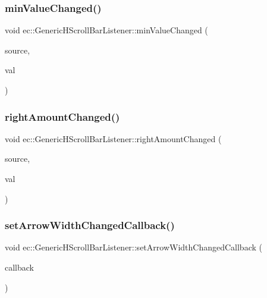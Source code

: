\subsubsection{\texorpdfstring{min\+Value\+Changed()}{minValueChanged()}}
{\footnotesize\ttfamily void ec\+::\+Generic\+H\+Scroll\+Bar\+Listener\+::min\+Value\+Changed (\begin{DoxyParamCaption}\item[{agui\+::\+H\+Scroll\+Bar $\ast$}]{source,  }\item[{int}]{val }\end{DoxyParamCaption})\hspace{0.3cm}{\ttfamily [override]}}

\mbox{\label{classec_1_1_generic_h_scroll_bar_listener_a770fbca4c0ce3c02dec9045e44043737}} 
\subsubsection{\texorpdfstring{right\+Amount\+Changed()}{rightAmountChanged()}}
{\footnotesize\ttfamily void ec\+::\+Generic\+H\+Scroll\+Bar\+Listener\+::right\+Amount\+Changed (\begin{DoxyParamCaption}\item[{agui\+::\+H\+Scroll\+Bar $\ast$}]{source,  }\item[{int}]{val }\end{DoxyParamCaption})\hspace{0.3cm}{\ttfamily [override]}}

\mbox{\label{classec_1_1_generic_h_scroll_bar_listener_ab74b91e3fe9cfa656a0ba09a9391173e}} 
\subsubsection{\texorpdfstring{set\+Arrow\+Width\+Changed\+Callback()}{setArrowWidthChangedCallback()}}
{\footnotesize\ttfamily void ec\+::\+Generic\+H\+Scroll\+Bar\+Listener\+::set\+Arrow\+Width\+Changed\+Callback (\begin{DoxyParamCaption}\item[{const \mbox{\hyperlink{classec_1_1_generic_h_scroll_bar_listener_a5f6e07b1012f51b6ef9be3d9ac81e121}{Arrow\+Width\+Changed\+\_\+\+Callback}} \&}]{callback }\end{DoxyParamCaption})}

